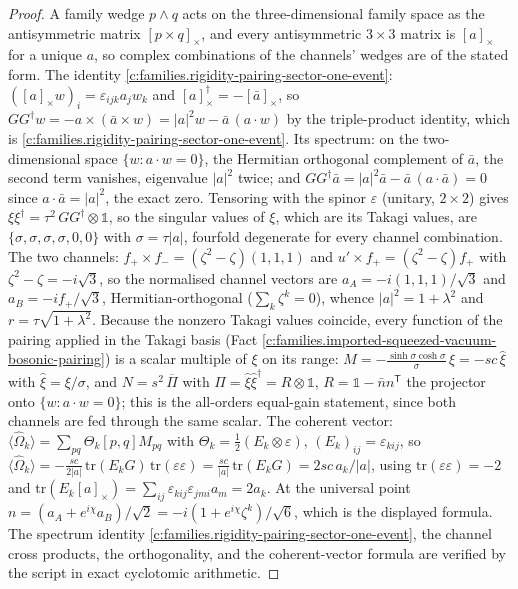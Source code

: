 \documentclass[11pt]{article}
\theoremstyle{definition}
\theoremstyle{plain}
\begin{document}
\begin{proof}
A family wedge $p \wedge q$ acts on the three-dimensional family space as the antisymmetric matrix $[p \times q]_{\times}$, and every antisymmetric $3 \times 3$ matrix is $[a]_{\times}$ for a unique $a$, so complex combinations of the channels' wedges are of the stated form. The identity \ref{c:families.rigidity-pairing-sector-one-event}: $([a]_{\times}w)_{i} = \varepsilon_{ijk}a_{j}w_{k}$ and $[a]_{\times}^{\dagger} = -[\bar a]_{\times}$, so $GG^{\dagger}w = -a \times (\bar a \times w) = |a|^{2}w - \bar{a}\,(a \cdot w)$ by the triple-product identity, which is \ref{c:families.rigidity-pairing-sector-one-event}. Its spectrum: on the two-dimensional space $\{w : a \cdot w = 0\}$, the Hermitian orthogonal complement of $\bar a$, the second term vanishes, eigenvalue $|a|^{2}$ twice; and $GG^{\dagger}\bar{a} = |a|^{2}\bar{a} - \bar{a}\,(a \cdot \bar{a}) = 0$ since $a \cdot \bar{a} = |a|^{2}$, the exact zero. Tensoring with the spinor $\varepsilon$ (unitary, $2 \times 2$) gives $\xi\xi^{\dagger} = \tau^{2}\,GG^{\dagger} \otimes \mathbb{1}$, so the singular values of $\xi$, which are its Takagi values, are $\{\sigma, \sigma, \sigma, \sigma, 0, 0\}$ with $\sigma = \tau|a|$, fourfold degenerate for every channel combination. The two channels: $f_{+} \times f_{-} = (\zeta^{2} - \zeta)(1,1,1)$ and $u' \times f_{+} = (\zeta^{2} - \zeta)f_{+}$ with $\zeta^{2} - \zeta = -i\sqrt{3}$, so the normalised channel vectors are $a_{A} = -i(1,1,1)/\sqrt{3}$ and $a_{B} = -if_{+}/\sqrt{3}$, Hermitian-orthogonal ($\sum_{k}\zeta^{k} = 0$), whence $|a|^{2} = 1 + \lambda^{2}$ and $r = \tau\sqrt{1+\lambda^{2}}$. Because the nonzero Takagi values coincide, every function of the pairing applied in the Takagi basis (Fact \ref{c:families.imported-squeezed-vacuum-bosonic-pairing}) is a scalar multiple of $\xi$ on its range: $M = -\tfrac{\sinh\sigma\cosh\sigma}{\sigma}\,\xi = -sc\,\hat\xi$ with $\hat\xi = \xi/\sigma$, and $N = s^{2}\,\overline{\Pi}$ with $\Pi = \hat\xi\hat\xi^{\dagger} = R \otimes \mathbb{1}$, $R = \mathbb{1} - \bar{n}n^{\mathsf{T}}$ the projector onto $\{w : a \cdot w = 0\}$; this is the all-orders equal-gain statement, since both channels are fed through the same scalar. The coherent vector: $\langle\hat\Omega_{k}\rangle = \sum_{pq}\Theta_{k}[p,q]M_{pq}$ with $\Theta_{k} = \tfrac12(E_{k} \otimes \varepsilon)$, $(E_{k})_{ij} = \varepsilon_{kij}$, so $\langle\hat\Omega_{k}\rangle = -\tfrac{sc}{2|a|}\,\mathrm{tr}(E_{k}G)\,\mathrm{tr}(\varepsilon\varepsilon) = \tfrac{sc}{|a|}\,\mathrm{tr}(E_{k}G) = 2sc\,a_{k}/|a|$, using $\mathrm{tr}(\varepsilon\varepsilon) = -2$ and $\mathrm{tr}(E_{k}[a]_{\times}) = \sum_{ij}\varepsilon_{kij}\varepsilon_{jmi}a_{m} = 2a_{k}$. At the universal point $n = (a_{A} + e^{i\chi}a_{B})/\sqrt{2} = -i(1 + e^{i\chi}\zeta^{k})/\sqrt{6}$, which is the displayed formula. The spectrum identity \ref{c:families.rigidity-pairing-sector-one-event}, the channel cross products, the orthogonality, and the coherent-vector formula are verified by the script in exact cyclotomic arithmetic.

\end{proof}
\end{document}
